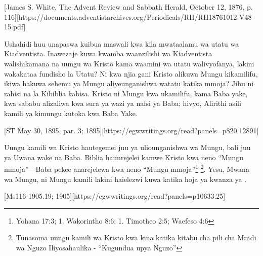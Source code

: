 [James S. White, The Advent Review and Sabbath Herald, October 12, 1876, p. 116][https://documents.adventistarchives.org/Periodicals/RH/RH18761012-V48-15.pdf]

Ushahidi huu unapaswa kuibua maswali kwa kila mwataalamu wa utatu wa Kiadventista. Inawezaje kuwa kwamba waanzilishi wa Kiadventista walishikamana na uungu wa Kristo kama waamini wa utatu walivyofanya, lakini wakakataa fundisho la Utatu? Ni kwa njia gani Kristo alikuwa Mungu kikamilifu, ikiwa hakuwa sehemu ya Mungu aliyeunganishwa watatu katika mmoja? Jibu ni rahisi na la Kibiblia kabisa. Kristo ni Mungu kwa ukamilifu, kama Baba yake, kwa sababu alizaliwa kwa sura ya wazi ya nafsi ya Baba; hivyo, Alirithi asili kamili ya kimungu kutoka kwa Baba Yake.

[ST May 30, 1895, par. 3; 1895][https://egwwritings.org/read?panels=p820.12891]

Uungu kamili wa Kristo hautegemei juu ya  uliounganishwa wa Mungu, bali juu ya Uwana wake na Baba. Biblia haimrejelei kamwe Kristo kwa neno “Mungu mmoja”—Baba pekee anarejelewa kwa neno “Mungu mmoja”\footnote{Yohana 17:3; 1. Wakorintho 8:6; 1. Timotheo 2:5; Waefeso 4:6} \footnote{Tunasoma uungu kamili wa Kristo kwa kina katika kitabu cha pili cha Mradi wa Nguzo Iliyosahaulika - “Kugundua upya Nguzo”}. Yesu, Mwana wa Mungu, ni Mungu kamili lakini haielezwi kuwa  katika hoja ya kwanza ya .

[Ms116-1905.19; 1905][https://egwwritings.org/read?panels=p10633.25]

